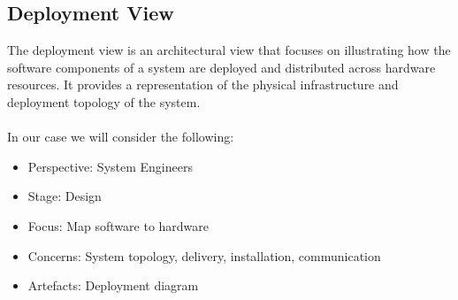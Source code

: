 \subsection{Deployment View\label{subSection::DeploymentView}}
The deployment view is an architectural view that focuses on illustrating how the software components of a system are deployed and distributed across hardware resources. It provides a representation of the physical infrastructure and deployment topology of the system.\\\\ 
     In our case we will consider the following:
     \begin{itemize}
         \item Perspective: System Engineers
         \item Stage: Design
         \item Focus: Map software to hardware
         \item Concerns: System topology, delivery, installation, communication
         \item Artefacts: Deployment diagram
     \end{itemize}

